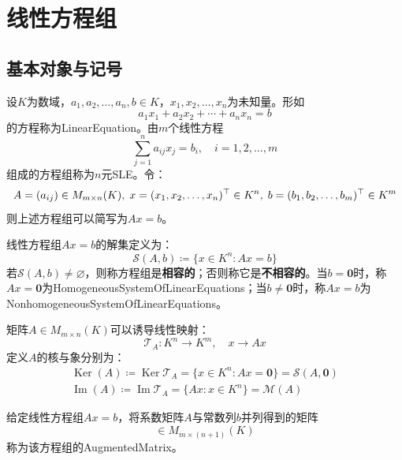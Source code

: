 \section{线性方程组}

\subsection{基本对象与记号}
\begin{definition}
	设$K$为数域，$a_1,a_2,\dots,a_n,b\in K$，$x_1,x_2,\dots,x_n$为未知量。形如
	\begin{equation*}
		a_1x_1+a_2x_2+\cdots+a_nx_n=b
	\end{equation*}
	的方程称为\gls{LinearEquation}。由$m$个线性方程
	\begin{equation*}
		\sum_{j=1}^{n}a_{ij}x_j=b_i,\quad i=1,2,\dots,m
	\end{equation*}
	组成的方程组称为$n$元\gls{SLE}。令：
	\begin{equation*}
		A=(a_{ij})\in M_{m\times n}(K),\;x=(x_1, x_2, \dots, x_{n})^{\top}\in K^n,\;b=(b_1, b_2, \dots, b_{m})^{\top}\in K^m
	\end{equation*}
	则上述方程组可以简写为$Ax=b$。
\end{definition}
\begin{definition}
	线性方程组$Ax=b$的解集定义为：
	\begin{equation*}
		\mathcal{S}(A,b)\coloneq\{x\in K^n:Ax=b\}
	\end{equation*}
	若$\mathcal{S}(A,b)\ne\varnothing$，则称方程组是\textbf{相容的}；否则称它是\textbf{不相容的}。当$b=\mathbf{0}$时，称$Ax=\mathbf{0}$为\gls{HomogeneousSystemOfLinearEquations}；当$b\ne\mathbf{0}$时，称$Ax=b$为\gls{NonhomogeneousSystemOfLinearEquations}。
\end{definition}
\begin{definition}
	矩阵$A\in M_{m\times n}(K)$可以诱导线性映射：
	\begin{equation*}
		\mathcal{T}_A:K^n\to K^m,\quad x\to Ax
	\end{equation*}
	定义$A$的核与象分别为：
	\begin{gather*}
		\operatorname{Ker}(A)\coloneq\operatorname{Ker}\mathcal{T}_A=\{x\in K^n:Ax=\mathbf{0}\}=\mathcal{S}(A,\mathbf{0}) \\
		\operatorname{Im}(A)\coloneq\operatorname{Im}\mathcal{T}_A=\{Ax:x\in K^n\}=\mathcal{M}(A)
	\end{gather*}
\end{definition}
\begin{definition}
	给定线性方程组$Ax=b$，将系数矩阵$A$与常数列$b$并列得到的矩阵
	\begin{equation*}
		[A|b]\in M_{m\times(n+1)}(K)
	\end{equation*}
	称为该方程组的\gls{AugmentedMatrix}。
\end{definition}

